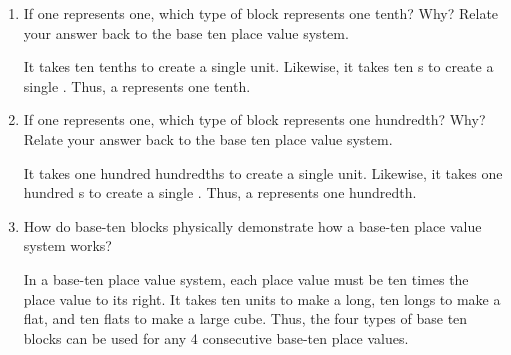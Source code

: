 
\begin{enumerate}
    \item If one  represents one, which type of block represents one tenth? Why? Relate your answer back to the base ten place value system.

    \vspace{20pt}
    \begin{ansenv}
        It takes ten tenths to create a single unit. Likewise, it takes ten s to create a single . Thus, a  represents one tenth.
    \end{ansenv}
    \vfill

    \item If one  represents one, which type of block represents one hundredth? Why? Relate your answer back to the base ten place value system.

    \vspace{20pt}
    \begin{ansenv}
        It takes one hundred hundredths to create a single unit. Likewise, it takes one hundred s to create a single . Thus, a  represents one hundredth. 
    \end{ansenv}
    \vfill

    \item How do base-ten blocks physically demonstrate how a base-ten place value system works?

    \vspace{20pt}
    \begin{ansenv}
        In a base-ten place value system, each place value must be ten times the place value to its right. It takes ten units to make a long, ten longs to make a flat, and ten flats to make a large cube. Thus, the four types of base ten blocks can be used for any 4 consecutive base-ten place values.
    \end{ansenv}
    \vfill

\end{enumerate}
